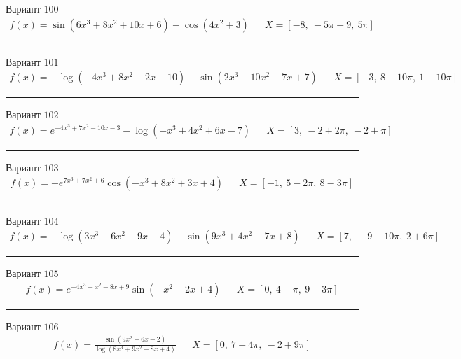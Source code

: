 \documentclass[11pt]{report}
\begin{document}
Вариант \(100\)
\begin{align*}
    f(x) = \sin{\left(6 x^{3} + 8 x^{2} + 10 x + 6 \right)} - \cos{\left(4 x^{2} + 3 \right)} && X = \left[ -8, \  - 5 \pi - 9, \  5 \pi\right]
\end{align*}
\begin{center}
    \noindent\rule{8cm}{0.4pt}
\end{center}
Вариант \(101\)
\begin{align*}
    f(x) = - \log{\left(- 4 x^{3} + 8 x^{2} - 2 x - 10 \right)} - \sin{\left(2 x^{3} - 10 x^{2} - 7 x + 7 \right)} && X = \left[ -3, \  8 - 10 \pi, \  1 - 10 \pi\right]
\end{align*}
\begin{center}
    \noindent\rule{8cm}{0.4pt}
\end{center}
Вариант \(102\)
\begin{align*}
    f(x) = e^{- 4 x^{3} + 7 x^{2} - 10 x - 3} - \log{\left(- x^{3} + 4 x^{2} + 6 x - 7 \right)} && X = \left[ 3, \  -2 + 2 \pi, \  -2 + \pi\right]
\end{align*}
\begin{center}
    \noindent\rule{8cm}{0.4pt}
\end{center}
Вариант \(103\)
\begin{align*}
    f(x) = - e^{7 x^{3} + 7 x^{2} + 6} \cos{\left(- x^{3} + 8 x^{2} + 3 x + 4 \right)} && X = \left[ -1, \  5 - 2 \pi, \  8 - 3 \pi\right]
\end{align*}
\begin{center}
    \noindent\rule{8cm}{0.4pt}
\end{center}
Вариант \(104\)
\begin{align*}
    f(x) = - \log{\left(3 x^{3} - 6 x^{2} - 9 x - 4 \right)} - \sin{\left(9 x^{3} + 4 x^{2} - 7 x + 8 \right)} && X = \left[ 7, \  -9 + 10 \pi, \  2 + 6 \pi\right]
\end{align*}
\begin{center}
    \noindent\rule{8cm}{0.4pt}
\end{center}
Вариант \(105\)
\begin{align*}
    f(x) = e^{- 4 x^{3} - x^{2} - 8 x + 9} \sin{\left(- x^{2} + 2 x + 4 \right)} && X = \left[ 0, \  4 - \pi, \  9 - 3 \pi\right]
\end{align*}
\begin{center}
    \noindent\rule{8cm}{0.4pt}
\end{center}
Вариант \(106\)
\begin{align*}
    f(x) = \frac{\sin{\left(9 x^{2} + 6 x - 2 \right)}}{\log{\left(8 x^{3} + 9 x^{2} + 8 x + 4 \right)}} && X = \left[ 0, \  7 + 4 \pi, \  -2 + 9 \pi\right]
\end{align*}
\end{document}
